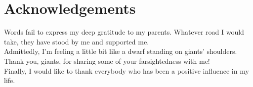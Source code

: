 \section*{Acknowledgements}
Words fail to express my deep gratitude to my parents. Whatever road I would take, they have stood by me and supported me.\\

\noindent
Admittedly, I'm feeling a little bit like a dwarf standing on giants' shoulders. Thank you, giants, for sharing some of your farsightedness with me!\\

\noindent
Finally, I would like to thank everybody who has been a positive influence in my life.
